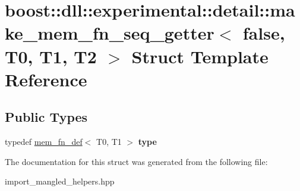 \hypertarget{a01492}{}\section{boost\+:\+:dll\+:\+:experimental\+:\+:detail\+:\+:make\+\_\+mem\+\_\+fn\+\_\+seq\+\_\+getter$<$ false, T0, T1, T2 $>$ Struct Template Reference}
\label{a01492}
\subsection*{Public Types}
\begin{DoxyCompactItemize}
\item 
\mbox{\label{a01492_a8092888cbf07620b7979dbe8cfd96bb7}} 
typedef \hyperlink{a01476}{mem\+\_\+fn\+\_\+def}$<$ T0, T1 $>$ {\bfseries type}
\end{DoxyCompactItemize}


The documentation for this struct was generated from the following file\+:\begin{DoxyCompactItemize}
\item 
import\+\_\+mangled\+\_\+helpers.\+hpp\end{DoxyCompactItemize}
